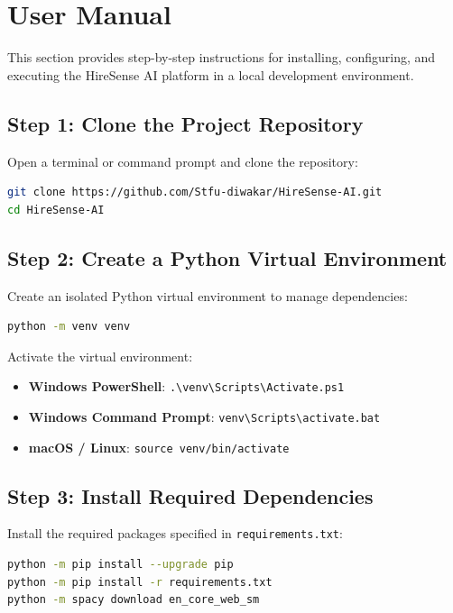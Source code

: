 \documentclass[12pt,a4paper]{report}
\begin{document}
\newpage
\chapter*{User Manual}

This section provides step-by-step instructions for installing, configuring, and executing the HireSense AI platform in a local development environment.

\section*{Step 1: Clone the Project Repository}
Open a terminal or command prompt and clone the repository:
\begin{lstlisting}[language=bash]
git clone https://github.com/Stfu-diwakar/HireSense-AI.git
cd HireSense-AI
\end{lstlisting}

\section*{Step 2: Create a Python Virtual Environment}
Create an isolated Python virtual environment to manage dependencies:
\begin{lstlisting}[language=bash]
python -m venv venv
\end{lstlisting}
Activate the virtual environment:
\begin{itemize}
    \item \textbf{Windows PowerShell}: \texttt{.\textbackslash venv\textbackslash Scripts\textbackslash Activate.ps1}
    \item \textbf{Windows Command Prompt}: \texttt{venv\textbackslash Scripts\textbackslash activate.bat}
    \item \textbf{macOS / Linux}: \texttt{source venv/bin/activate}
\end{itemize}

\section*{Step 3: Install Required Dependencies}
Install the required packages specified in \texttt{requirements.txt}:
\begin{lstlisting}[language=bash]
python -m pip install --upgrade pip
python -m pip install -r requirements.txt
python -m spacy download en_core_web_sm
\end{lstlisting}
\end{document}
